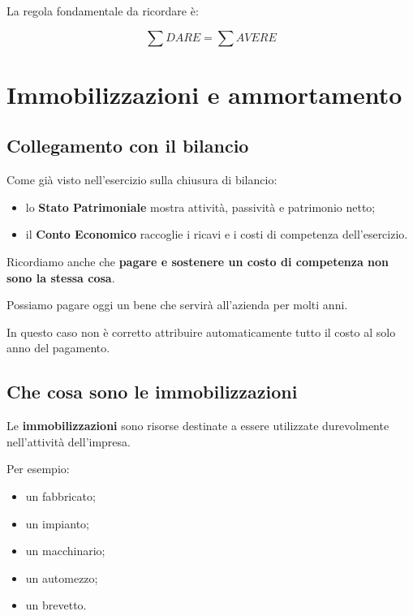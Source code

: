 \noindent La regola fondamentale da ricordare è:

\[
\boxed{
\sum DARE=\sum AVERE
}
\]

\section{Immobilizzazioni e ammortamento}

\subsection{Collegamento con il bilancio}

\noindent Come già visto nell'esercizio
sulla chiusura di bilancio:

\begin{itemize}
    \item lo \textbf{Stato Patrimoniale}
    mostra attività, passività
    e patrimonio netto;

    \item il \textbf{Conto Economico}
    raccoglie i ricavi e i costi
    di competenza dell'esercizio.
\end{itemize}

\noindent Ricordiamo anche che
\textbf{pagare e sostenere un costo
di competenza non sono la stessa cosa}.

\noindent Possiamo pagare oggi un bene
che servirà all'azienda per molti anni.

\noindent In questo caso non è corretto
attribuire automaticamente
tutto il costo al solo anno del pagamento.


\subsection{Che cosa sono le immobilizzazioni}

\noindent Le \textbf{immobilizzazioni}
sono risorse destinate a essere utilizzate
durevolmente nell'attività dell'impresa.

\noindent Per esempio:

\begin{itemize}
    \item un fabbricato;
    \item un impianto;
    \item un macchinario;
    \item un automezzo;
    \item un brevetto.
\end{itemize}

